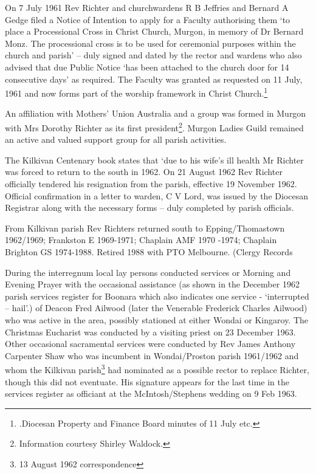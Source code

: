 On 7 July 1961 Rev Richter and churchwardens R B Jeffries and Bernard A
Gedge filed a Notice of Intention to apply for a Faculty authorising
them `to place a Processional Cross in Christ Church, Murgon, in memory
of Dr Bernard Monz. The processional cross is to be used for ceremonial
purposes within the church and parish' -- duly signed and dated by the
rector and wardens who also advised that due Public Notice `has been
attached to the church door for 14 consecutive days' as required. The
Faculty was granted as requested on 11 July, 1961 and now forms part of
the worship framework in Christ Church.\footnote{.Diocesan Property and
  Finance Board minutes of 11 July etc.}

An affiliation with Mothers' Union Australia and a group was formed in
Murgon with Mrs Dorothy Richter as its first president\footnote{Information
  courtesy Shirley Waldock.}. Murgon Ladies Guild remained an active and
valued support group for all parish activities.

The Kilkivan Centenary book states that `due to his wife's ill health Mr
Richter was forced to return to the south in 1962. On 21 August 1962 Rev
Richter officially tendered his resignation from the parish, effective
19 November 1962. Official confirmation in a letter to warden, C V Lord,
was issued by the Diocesan Registrar along with the necessary forms --
duly completed by parish officials.

From Kilkivan parish Rev Richters returned south to Epping/Thomastown
1962/1969; Frankston E 1969-1971; Chaplain AMF 1970 -1974; Chaplain
Brighton GS 1974-1988. Retired 1988 with PTO Melbourne. (Clergy Records

During the interregnum local lay persons conducted services or Morning
and Evening Prayer with the occasional assistance (as shown in the
December 1962 parish services register for Boonara which also indicates
one service - `interrupted -- hail'.) of Deacon Fred Ailwood (later the
Venerable Frederick Charles Ailwood) who was active in the area,
possibly stationed at either Wondai or Kingaroy. The Christmas Eucharist
was conducted by a visiting priest on 23 December 1963. Other occasional
sacramental services were conducted by Rev James Anthony Carpenter Shaw
who was incumbent in Wondai/Proston parish 1961/1962 and whom the
Kilkivan parish\footnote{13 August 1962 correspondence} had nominated as
a possible rector to replace Richter, though this did not eventuate. His
signature appears for the last time in the services register as
officiant at the McIntosh/Stephens wedding on 9 Feb 1963.

